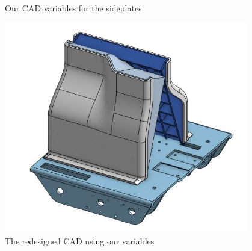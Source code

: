 \begin{figure}[ht]
\begin{minipage}[b]{.48\textwidth}
  \caption{Our CAD variables for the sideplates}
  \label{fig:pic1}
\end{minipage}%
\hfill%
\begin{minipage}[b]{.48\textwidth}
  \centering
  \includegraphics[width=0.95\textwidth]{Meetings/November/11-28-21/11-28-21_CAD_Figure2 - Nathan Forrer.JPG}
  \caption{The redesigned CAD using our variables}
  \label{fig:pic2}
\end{minipage}
\end{figure}



